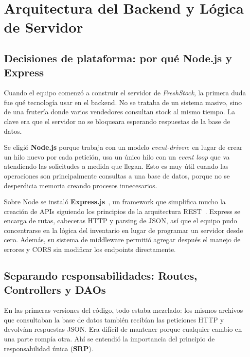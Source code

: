 \documentclass[journal]{IEEEtran}
\newcommand{\app}{\textit{FreshStock}}
\begin{document}
	
	
	\section{Arquitectura del Backend y L\'{o}gica de Servidor}
	\label{sec:backend}
	
	\subsection{Decisiones de plataforma: por qu\'{e} Node.js y Express}
	\label{subsec:decisiones}
	
	Cuando el equipo comenz\'{o} a construir el servidor de \app{},
	la primera duda fue qu\'{e} tecnolog\'{i}a usar en el backend. No
	se trataba de un sistema masivo, sino de una fruter\'{i}a donde
	varios vendedores consultan stock al mismo tiempo. La clave era
	que el servidor no se bloqueara esperando respuestas de la base
	de datos.
	
	Se eligi\'{o} \textbf{Node.js} porque trabaja con un modelo
	\emph{event-driven}: en lugar de crear un hilo nuevo por cada
	petici\'{o}n, usa un \'{u}nico hilo con un \textit{event loop}
	que va atendiendo las solicitudes a medida que llegan. Esto es
	muy \'{u}til cuando las operaciones son principalmente consultas
	a una base de datos, porque no se desperdicia memoria creando
	procesos innecesarios.
	
	Sobre Node se instal\'{o} \textbf{Express.js}~\cite{ExpressJS:2025},
	un framework que simplifica mucho la creaci\'{o}n de APIs siguiendo
	los principios de la arquitectura REST~\cite{Fielding:2000}. Express
	se encarga de rutas, cabeceras HTTP y parsing de JSON, as\'{i} que
	el equipo pudo concentrarse en la l\'{o}gica del inventario en lugar
	de programar un servidor desde cero. Adem\'{a}s, su sistema de
	middleware permiti\'{o} agregar despu\'{e}s el manejo de errores y
	CORS sin modificar los endpoints directamente.
	
	\subsection{Separando responsabilidades: Routes, Controllers y DAOs}
	\label{subsec:capas}
	
	En las primeras versiones del c\'{o}digo, todo estaba mezclado:
	los mismos archivos que consultaban la base de datos tambi\'{e}n
	recib\'{i}an las peticiones HTTP y devolv\'{i}an respuestas JSON.
	Era dif\'{i}cil de mantener porque cualquier cambio en una parte
	romp\'{i}a otra. Ah\'{i} se entendi\'{o} la importancia del
	principio de responsabilidad \'{u}nica (\textbf{SRP}).
	
\end{document}
